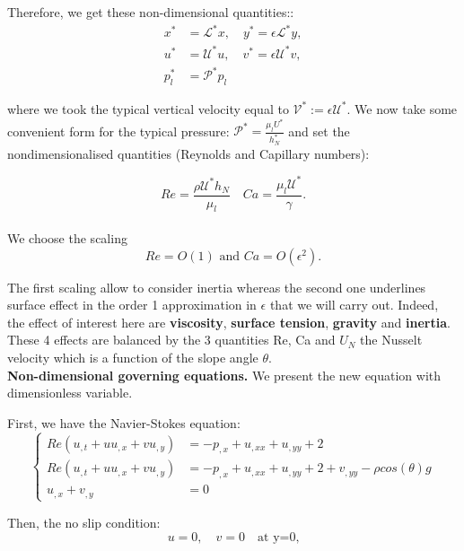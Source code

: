 \documentclass[12pt]{article}
\begin{document}
Therefore, we get these non-dimensional quantities:: 
\begin{align*}
    x^* &= \mathcal{L^*}x, \quad y^*= \epsilon \mathcal{L^*}y, \\
    u^* &= \mathcal{U^*}u,  \quad v^*= \epsilon \mathcal{U^*}v, \\
    p_l^* &= \mathcal{P^*}p_l
\end{align*}

where we took the typical vertical velocity equal to $\mathcal{V}^*:=\epsilon\mathcal{U}^*.$ We now take some convenient form for the typical pressure: $\mathcal{P^*} = \frac{\mu_lU^*}{h_N^*}$ and set the nondimensionalised quantities (Reynolds and Capillary numbers): 

\begin{equation}
    \boxed{
    Re = \frac{\rho \mathcal{U^*} h_N}{\mu_l} \quad Ca = \frac{\mu_l \mathcal{U^*}}{\gamma}.
    }
\end{equation}
\\

We choose the scaling 
\begin{equation}
Re=O(1) \text{ and } Ca=O(\epsilon^2). 
\end{equation}

The first scaling allow to consider inertia whereas the second one underlines surface effect in the order 1 approximation in $\epsilon$ that we will carry out. 
Indeed, the effect of interest here are \textbf{viscosity}, \textbf{surface tension}, \textbf{gravity} and \textbf{inertia}. These 4 effects are balanced by the 3 quantities Re, Ca and $U_N$ the Nusselt velocity which is a function of the slope angle $\theta$.
\\
            
 \textbf{Non-dimensional governing equations.} We present the new equation with dimensionless variable.

First, we have the Navier-Stokes equation:
\begin{equation}\label{eq NavierStokes1}
\left\{
\begin{aligned}
    Re(u_{,t}+uu_{,x}+vu_{,y}) &= -p_{,x} + u_{,xx} + u_{,yy} + 2\\
    Re(u_{,t}+uu_{,x}+vu_{,y}) &= -p_{,x} + u_{,xx} + u_{,yy} + 2 + v_{,yy} - \rho cos(\theta)g\\
     u_{,x} + v_{,y} &= 0 
\end{aligned}
\right.
\end{equation}


Then, the no slip condition: 
\begin{equation}\label{eq_no_slip}
    u=0, \quad v=0 \quad \text{at y=0,}
\end{equation}
\end{document}
